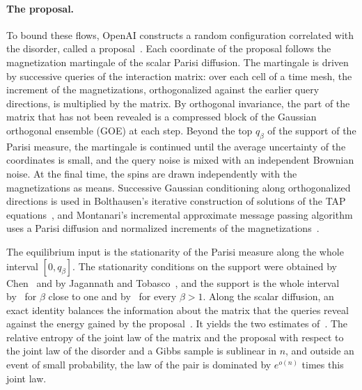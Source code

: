 \paragraph{The proposal.}
To bound these flows, OpenAI constructs a random configuration correlated
with the disorder, called a proposal~\cite[Section~4]{oai-typical-upper}.
Each coordinate of the proposal follows the magnetization martingale of the
scalar Parisi diffusion. The martingale is driven by successive queries of
the interaction matrix: over each cell of a time mesh, the increment of the
magnetizations, orthogonalized against the earlier query directions, is
multiplied by the matrix. By orthogonal invariance, the part of the matrix
that has not been revealed is a compressed block of the Gaussian orthogonal
ensemble (GOE) at each step. Beyond the top $q_\beta$ of the support of the
Parisi measure, the martingale is continued until the average uncertainty of
the coordinates is small, and the query noise is mixed with an independent
Brownian noise. At the final time, the spins are drawn independently with
the magnetizations as means. Successive Gaussian conditioning along
orthogonalized directions is used in Bolthausen's iterative construction of
solutions of the TAP equations~\cite[Sections~2--3]{bolthausen-2014}, and
Montanari's incremental approximate message passing algorithm uses a Parisi
diffusion and normalized increments of the
magnetizations~\cite[Sections~2--3]{montanari-2021}.

The equilibrium input is the stationarity of the Parisi measure along the
whole interval $[0,q_\beta]$. The stationarity conditions on the support were
obtained by Chen~\cite[Theorem~2 and Proposition~1]{chen-2017} and by
Jagannath and Tobasco~\cite[Proposition~1.1 and
Corollary~3.10]{jagannath-tobasco-2017}, and the support is the whole interval
by~\cite[Theorem~1]{zhou-2026} for $\beta$ close to one and
by~\cite[Theorem~1.1]{full-rsb} for every $\beta>1$. Along the scalar
diffusion, an exact identity balances the information about the matrix that
the queries reveal against the energy gained by the
proposal~\cite[Section~3, Lemma~4]{oai-typical-upper}. It yields the two
estimates of~\cite[Proposition~5]{oai-typical-upper}. The relative entropy of
the joint law of the matrix and the proposal with respect to the joint law of
the disorder and a Gibbs sample is sublinear in $n$, and outside an event of
small probability, the law of the pair is dominated by $e^{o(n)}$ times this
joint law.

